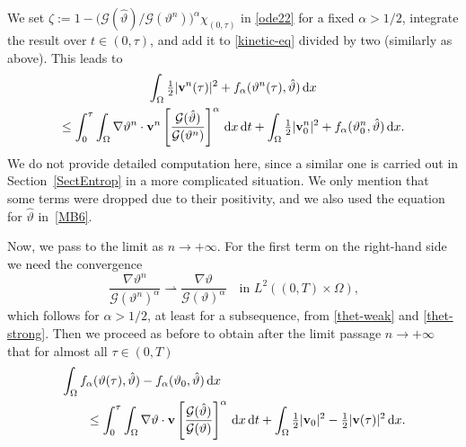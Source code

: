 \documentclass[11pt, a4paper, reqno]{amsart}
\numberwithin{equation}{section}
\newcommand{\thetah}{\hat\thet}
\newcommand{\vc}[1]{{\bf #1}}
\newcommand{\vv}{\vc{v}}
\newcommand{\thet}{\vartheta}
\newcommand{\dt}{\,{\rm d} t }
\newcommand{\dx}{\,{\rm d} {x}}
\newcommand{\dxdt}{\dx  \dt}
\newcommand{\G}{\mathcal{G}}
\newcommand{\al}{\alpha}
\newcommand{\intO}[1]{\int_{\Omega} #1 \dx}
\newcommand{\inttO}[1]{\int_0^{\tau} \int_{\Omega} #1 \dxdt}
\newcommand{\ff}{f}
\begin{document}
We set $\zeta:= 1-\bigl({\G(\thetah)/\G(\thet^n)}\bigr)^\alpha \chi_{(0,\tau)}$ in \eqref{ode22} for a fixed $\alpha>1/2$, 
integrate the result over $t\in (0,\tau)$, and add it to \eqref{kinetic-eq} divided by two (similarly as above). 
This leads to 
\begin{multline} 
    \intO{\tfrac12|\vv^n(\tau)|^2+\ff_\alpha(\thet^n(\tau),\thetah)}\\
    \leq \inttO{\nabla\thet^n \cdot \vv^n \left[\frac{\G(\thetah)}{\G(\thet^n)}\right]^\al}
      +\intO{\tfrac12|\vv_0^n|^2+\ff_\alpha(\thet_0^n,\thetah)}.
\end{multline}
We do not provide detailed computation here, since a similar one is carried out in Section~\ref{SectEntrop} in a more complicated situation. 
We only mention that some terms were dropped due to their positivity, and we also used the equation for $\thetah$ in~\eqref{MB6}.

Now, we pass to the limit as $n\to+\infty$. 
For the first term on the right-hand side we need the convergence
\[
    \frac{\nabla\thet^n}{\G(\thet^n)^\al}\rightharpoonup\frac{\nabla\thet}{\G(\thet)^\al} 
    \quad\mbox{in $L^2((0,T)\times\Omega)$,}
\]
which follows for $\alpha>1/2$, at least for a subsequence, from \eqref{thet-weak} and \eqref{thet-strong}. 
Then we proceed as before to obtain after the limit passage $n\to+\infty$ that for almost all $\tau \in (0,T)$
\begin{equation}\label{stop}
\begin{split} 
&\intO{\ff_\alpha(\thet(\tau),\thetah)-\ff_\alpha(\thet_0,\thetah)}\\
    &\qquad \leq \inttO{\nabla\thet \cdot \vv \left[\frac{\G(\thetah)}{\G(\thet)}\right]^\al}
      +\intO{\tfrac12|\vv_0|^2-\tfrac12|\vv(\tau)|^2}.
\end{split}
\end{equation}


\end{document}

